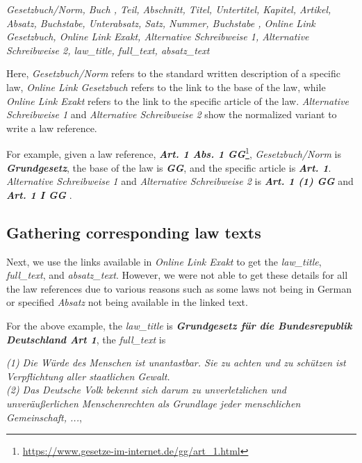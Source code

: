 \documentclass[sigconf]{acmart}
\begin{document}
\begin{framed}
{\textit{Gesetzbuch/Norm, Buch , Teil, Abschnitt, Titel, Untertitel, Kapitel, Artikel, Absatz, Buchstabe, Unterabsatz, Satz, Nummer, Buchstabe , Online Link Gesetzbuch, Online Link Exakt, Alternative Schreibweise 1, Alternative Schreibweise 2, law\_title, full\_text, absatz\_text}}
\end{framed}

Here, \textit{Gesetzbuch/Norm} refers to the standard written description of a specific law, \textit{Online Link Gesetzbuch} refers to the link to the base of the law, while \textit{Online Link Exakt} refers to the link to the specific article of the law. \textit{Alternative Schreibweise 1} and \textit{Alternative Schreibweise 2} show the normalized variant to write a law reference. 

For example, given a law reference, \textbf{\textit{Art. 1 Abs. 1 GG}}\footnote{\url{https://www.gesetze-im-internet.de/gg/art_1.html}}, \textit{Gesetzbuch/Norm} is \textbf{\textit{Grundgesetz}}, the base of the law is \textbf{\textit{GG}}, and the specific article is \textbf{\textit{Art. 1}}. \textit{Alternative Schreibweise 1} and \textit{Alternative Schreibweise 2} is \textbf{\textit{Art. 1 (1) GG}} and \textbf{\textit{Art. 1 I GG }}.

\subsection{Gathering corresponding law texts}
Next, we use the links available in \textit{Online Link Exakt} to get the \textit{law\_title}, \textit{full\_text}, and \textit{absatz\_text}. However, we were not able to get these details for all the law references due to various reasons such as some laws not being in German or specified \textit{Absatz} not being available in the linked text.

For the above example, the \textit{law\_title} is \textbf{\textit{Grundgesetz für die Bundesrepublik Deutschland Art 1}}, the \textit{full\_text} is\\

\begin{framed}
{\textit{(1) Die Würde des Menschen ist unantastbar. Sie zu achten und zu schützen ist Verpflichtung aller staatlichen Gewalt.\\
(2) Das Deutsche Volk bekennt sich darum zu unverletzlichen und unveräußerlichen Menschenrechten als Grundlage jeder menschlichen Gemeinschaft, ...},}
\end{framed}
\end{document}
